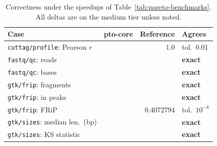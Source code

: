 \begin{table}[t]
\centering
\caption{Correctness under the speedups of Table~\ref{tab:pareto-benchmarks}.
All deltas are on the medium tier unless noted.}
\label{tab:concordance-exactness}
\footnotesize
\begin{tabular}{@{}lrrl@{}}
\toprule
Case & pto-core & Reference & Agrees \\
\midrule
\texttt{cuttag/profile}: Pearson $r$ & \ProfilePearsonMedium{} & 1.0 & tol.\ 0.01 \\
\texttt{fastq/qc}: reads & \FastqReadsExact{} & \FastqReadsExact{} & \textbf{exact} \\
\texttt{fastq/qc}: bases & \FastqBasesExact{} & \FastqBasesExact{} & \textbf{exact} \\
\texttt{gtk/frip}: fragments & \FripFragmentsMedium{} & \FripFragmentsMedium{} & \textbf{exact} \\
\texttt{gtk/frip}: in peaks & \FripInPeaksMedium{} & \FripInPeaksMedium{} & \textbf{exact} \\
\texttt{gtk/frip}: FRiP & \FripValueMedium{} & 0.4072794 & tol.\ $10^{-6}$ \\
\texttt{gtk/sizes}: median len.\ (bp) & \SizesMedianLenMedium{} & \SizesMedianLenMedium{} & \textbf{exact} \\
\texttt{gtk/sizes}: KS statistic & \SizesKsStat{} & \SizesKsStat{} & \textbf{exact} \\
\bottomrule
\end{tabular}
\end{table}
